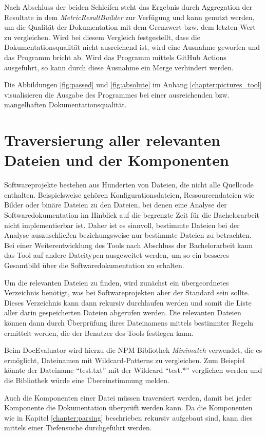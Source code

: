 Nach Abschluss der beiden Schleifen steht das Ergebnis durch Aggregation der Resultate in dem \textit{MetricResultBuilder} zur Verfügung und kann genutzt werden, um die Qualität der Dokumentation mit dem Grenzwert bzw. dem letzten Wert zu vergleichen. Wird bei diesem Vergleich festgestellt, dass die Dokumentationsqualität nicht ausreichend ist, wird eine Ausnahme geworfen und das Programm bricht ab. Wird das Programm mittels GitHub Actions ausgeführt, so kann durch diese Ausnahme ein Merge verhindert werden.

Die Abbildungen \ref{fig:passed} und \ref{fig:absolute} im Anhang \ref{chapter:pictures_tool} visualisieren die Ausgabe des Programmes bei einer ausreichenden bzw. mangelhaften Dokumentationsqualität.

\section{Traversierung aller relevanten Dateien und der Komponenten}\label{chapter:traversing}
Softwareprojekte bestehen aus Hunderten von Dateien, die nicht alle Quellcode enthalten. Beispielsweise gehören Konfigurationsdateien, Ressourcendateien wie Bilder oder binäre Dateien zu den Dateien, bei denen eine Analyse der Softwaredokumentation im Hinblick auf die begrenzte Zeit für die Bachelorarbeit nicht implementierbar ist. Daher ist es sinnvoll, bestimmte Dateien bei der Analyse auszuschließen beziehungsweise nur bestimmte Dateien zu betrachten. Bei einer Weiterentwicklung des Tools nach Abschluss der Bachelorarbeit kann das Tool auf andere Dateitypen ausgeweitet werden, um so ein besseres Gesamtbild über die Softwaredokumentation zu erhalten.

Um die relevanten Dateien zu finden, wird zunächst ein übergeordnetes Verzeichnis benötigt, was bei Softwareprojekten aber der Standard sein sollte. Dieses Verzeichnis kann dann rekursiv durchlaufen werden und somit die Liste aller darin gespeicherten Dateien abgerufen werden. Die relevanten Dateien können dann durch Überprüfung ihres Dateinamens mittels bestimmter Regeln ermittelt werden, die der Benutzer des Tools festlegen kann.

Beim DocEvaluator wird hierzu die NPM-Bibliothek \textit{Minimatch} \cite{Minimatch} verwendet, die es ermöglicht, Dateinamen mit Wildcard-Patterns zu vergleichen. Zum Beispiel könnte der Dateiname \enquote{test.txt} mit der Wildcard \enquote{test.*} verglichen werden und die Bibliothek würde eine Übereinstimmung melden.

Auch die Komponenten einer Datei müssen traversiert werden, damit bei jeder Komponente die Dokumentation überprüft werden kann. Da die Komponenten wie in Kapitel \ref{chapter:parsing} beschrieben rekursiv aufgebaut sind, kann dies mittels einer Tiefensuche durchgeführt werden.

